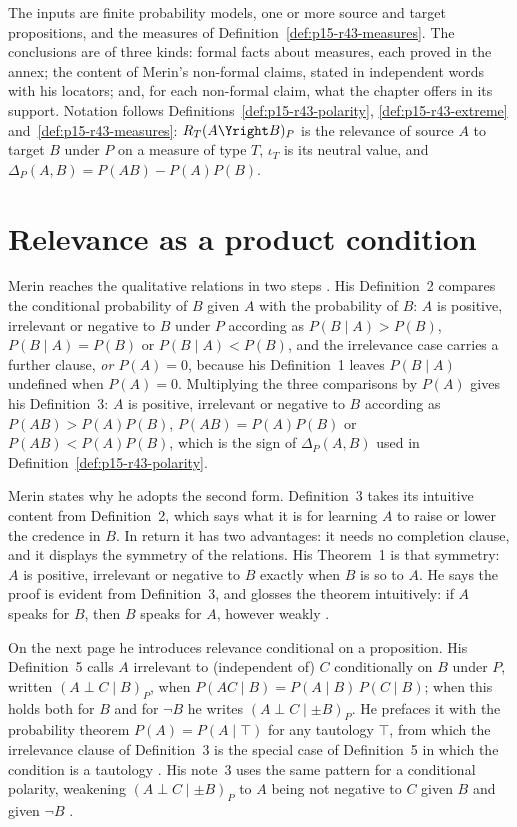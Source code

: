 The inputs are finite probability models, one or more source and target
propositions, and the measures of
Definition~\ref{def:p15-r43-measures}. The conclusions are of three
kinds: formal facts about measures, each proved in the annex; the
content of Merin's non-formal claims, stated in independent words with
his locators; and, for each non-formal claim, what the chapter offers
in its support. Notation follows
Definitions~\ref{def:p15-r43-polarity}, \ref{def:p15-r43-extreme}
and~\ref{def:p15-r43-measures}: \(R_T(A\Yright B)_P\) is the relevance
of source \(A\) to target \(B\) under \(P\) on a measure of type
\(T\), \(\iota_T\) is its neutral value, and
\(\Delta_P(A,B)=P(AB)-P(A)P(B)\).

\section{Relevance as a product condition}
\label{sec:p15-w02c-p15-027-product}

Merin reaches the qualitative relations in two steps
\cite[p.~266]{Merin2021Relevance}. His Definition~2 compares the
conditional probability of \(B\) given \(A\) with the probability of
\(B\): \(A\) is positive, irrelevant or negative to \(B\) under \(P\)
according as \(P(B\mid A)>P(B)\), \(P(B\mid A)=P(B)\) or \(P(B\mid A)<P(B)\),
and the irrelevance case carries a further clause, \emph{or \(P(A)=0\)},
because his Definition~1 leaves \(P(B\mid A)\) undefined when
\(P(A)=0\). Multiplying the three comparisons by \(P(A)\) gives his
Definition~3: \(A\) is positive, irrelevant or negative to \(B\)
according as \(P(AB)>P(A)P(B)\), \(P(AB)=P(A)P(B)\) or
\(P(AB)<P(A)P(B)\), which is the sign of \(\Delta_P(A,B)\) used in
Definition~\ref{def:p15-r43-polarity}.

Merin states why he adopts the second form. Definition~3 takes its
intuitive content from Definition~2, which says what it is for learning
\(A\) to raise or lower the credence in \(B\). In return it has two
advantages: it needs no completion clause, and it displays the symmetry
of the relations. His Theorem~1 is that symmetry: \(A\) is positive,
irrelevant or negative to \(B\) exactly when \(B\) is so to \(A\). He
says the proof is evident from Definition~3, and glosses the theorem
intuitively: if \(A\) speaks for \(B\), then \(B\) speaks for \(A\),
however weakly \cite[p.~266]{Merin2021Relevance}.

On the next page he introduces relevance conditional on a proposition.
His Definition~5 calls \(A\) irrelevant to (independent of) \(C\)
conditionally on \(B\) under \(P\), written \((A\perp C\mid B)_P\), when
\(P(AC\mid B)=P(A\mid B)\,P(C\mid B)\); when this holds both for \(B\) and
for \(\neg B\) he writes \((A\perp C\mid\pm B)_P\). He prefaces it with
the probability theorem \(P(A)=P(A\mid\top)\) for any tautology \(\top\),
from which the irrelevance clause of Definition~3 is the special case of
Definition~5 in which the condition is a tautology
\cite[p.~267]{Merin2021Relevance}. His note~3 uses the same pattern for a
conditional polarity, weakening \((A\perp C\mid\pm B)_P\) to
\(A\) being not negative to \(C\) given \(B\) and given \(\neg B\)
\cite[p.~274, n.~3]{Merin2021Relevance}.

